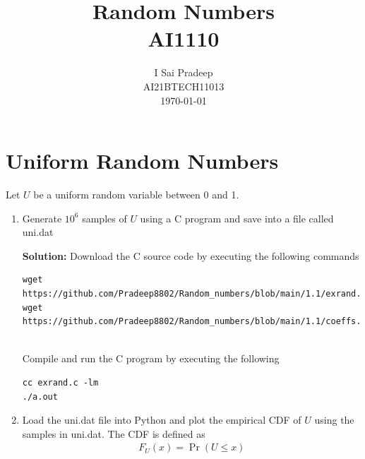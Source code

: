 \documentclass[journal,12pt,twocolumn]{IEEEtran}
\title{Random Numbers \\ \Large AI1110}
\author{I Sai Pradeep \\ \normalsize AI21BTECH11013 \\ \vspace*{20pt} \normalsize  \today}
\newcommand{\solution}{\noindent \textbf{Solution: }}
\providecommand{\pr}[1]{\ensuremath{\Pr\left(#1\right)}}
\numberwithin{equation}{section}
\renewcommand\thesection{\arabic{section}}
\begin{document}
 


	\maketitle
	\tableofcontents

	\section{Uniform Random Numbers}
	Let $U$ be a uniform random variable between 0 and 1.
	\begin{enumerate}[label=\thesection.\arabic*,ref=\thesection.\theenumi]
	\item Generate $10^6$ samples of $U$ using a C program and save into a file called uni.dat

	\solution Download the C source code by executing the following commands
	\begin{lstlisting}
wget https://github.com/Pradeep8802/Random_numbers/blob/main/1.1/exrand.c
wget https://github.com/Pradeep8802/Random_numbers/blob/main/1.1/coeffs.h
            
	\end{lstlisting}
	Compile and run the C program by executing the following
	\begin{lstlisting}
cc exrand.c -lm
./a.out
        \end{lstlisting}
	\item Load the uni.dat file into Python and plot the empirical CDF of $U$ using the samples in uni.dat. The CDF is defined as
	\begin{align}
		F_{U}(x) = \pr{U \le x}
	\end{align}


\end{enumerate}
\end{document}
